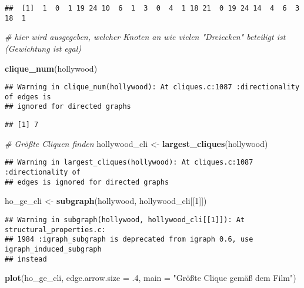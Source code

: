 \documentclass[
]{article}
\newenvironment{Shaded}{\begin{snugshade}}{\end{snugshade}}
\newcommand{\CommentTok}[1]{\textcolor[rgb]{0.56,0.35,0.01}{\textit{#1}}}
\newcommand{\DataTypeTok}[1]{\textcolor[rgb]{0.13,0.29,0.53}{#1}}
\newcommand{\DecValTok}[1]{\textcolor[rgb]{0.00,0.00,0.81}{#1}}
\newcommand{\FloatTok}[1]{\textcolor[rgb]{0.00,0.00,0.81}{#1}}
\newcommand{\KeywordTok}[1]{\textcolor[rgb]{0.13,0.29,0.53}{\textbf{#1}}}
\newcommand{\NormalTok}[1]{#1}
\newcommand{\StringTok}[1]{\textcolor[rgb]{0.31,0.60,0.02}{#1}}
\begin{document}
\begin{verbatim}
##  [1]  1  0  1 19 24 10  6  1  3  0  4  1 18 21  0 19 24 14  4  6  3 18  1
\end{verbatim}

\begin{Shaded}
\begin{Highlighting}[]
\CommentTok{# hier wird ausgegeben, welcher Knoten an wie vielen "Dreiecken" beteiligt ist (Gewichtung ist egal)}

\KeywordTok{clique_num}\NormalTok{(hollywood)}
\end{Highlighting}
\end{Shaded}

\begin{verbatim}
## Warning in clique_num(hollywood): At cliques.c:1087 :directionality of edges is
## ignored for directed graphs
\end{verbatim}

\begin{verbatim}
## [1] 7
\end{verbatim}

\begin{Shaded}
\begin{Highlighting}[]
\CommentTok{# Größte Cliquen finden}
\NormalTok{hollywood_cli <-}\StringTok{ }\KeywordTok{largest_cliques}\NormalTok{(hollywood)}
\end{Highlighting}
\end{Shaded}

\begin{verbatim}
## Warning in largest_cliques(hollywood): At cliques.c:1087 :directionality of
## edges is ignored for directed graphs
\end{verbatim}

\begin{Shaded}
\begin{Highlighting}[]
\NormalTok{ho_ge_cli <-}\StringTok{ }\KeywordTok{subgraph}\NormalTok{(hollywood, hollywood_cli[[}\DecValTok{1}\NormalTok{]])}
\end{Highlighting}
\end{Shaded}

\begin{verbatim}
## Warning in subgraph(hollywood, hollywood_cli[[1]]): At structural_properties.c:
## 1984 :igraph_subgraph is deprecated from igraph 0.6, use igraph_induced_subgraph
## instead
\end{verbatim}

\begin{Shaded}
\begin{Highlighting}[]
\KeywordTok{plot}\NormalTok{(ho_ge_cli, }\DataTypeTok{edge.arrow.size =} \FloatTok{.4}\NormalTok{,}
     \DataTypeTok{main =} \StringTok{"Größte Clique gemäß dem Film"}\NormalTok{)}
\end{Highlighting}
\end{Shaded}
\end{document}
